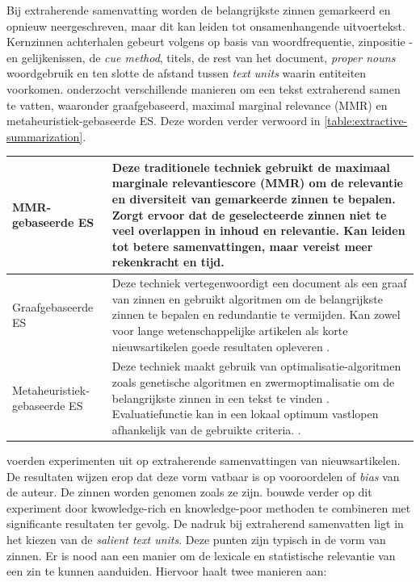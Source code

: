 \medspace

Bij extraherende samenvatting worden de belangrijkste zinnen gemarkeerd en opnieuw neergeschreven, maar dit kan leiden tot onsamenhangende uitvoertekst. Kernzinnen achterhalen gebeurt volgens \textcite{Khan2014} op basis van woordfrequentie, zinpositie -en gelijkenissen, de \textit{cue method}, titels, de rest van het document, \textit{proper nouns} woordgebruik en ten slotte de afstand tussen \textit{text units} waarin entiteiten voorkomen. \textcite{Verma2020} onderzocht verschillende manieren om een tekst extraherend samen te vatten, waaronder graafgebaseerd, maximal marginal relevance (MMR) en metaheuristiek-gebaseerde ES. Deze worden verder verwoord in \ref{table:extractive-summarization}.

\begin{center}
	\begin{tabular}{ | m{4cm} | m{12cm} | } 
		\hline
		MMR-gebaseerde ES & Deze traditionele techniek gebruikt de maximaal marginale relevantiescore (MMR) om de relevantie en diversiteit van gemarkeerde zinnen te bepalen. Zorgt ervoor dat de geselecteerde zinnen niet te veel overlappen in inhoud en relevantie. Kan leiden tot betere samenvattingen, maar vereist meer rekenkracht en tijd. \\
		\hline
		Graafgebaseerde ES & Deze techniek vertegenwoordigt een document als een graaf van zinnen en gebruikt algoritmen om de belangrijkste zinnen te bepalen en redundantie te vermijden. Kan zowel voor lange wetenschappelijke artikelen als korte nieuwsartikelen goede resultaten opleveren \autocite{McDonald2007, Lin2010}. \\ 
		\hline
		Metaheuristiek-gebaseerde ES & Deze techniek maakt gebruik van optimalisatie-algoritmen zoals genetische algoritmen en zwermoptimalisatie om de belangrijkste zinnen in een tekst te vinden \autocite{Premjith2015, Verma2020}. Evaluatiefunctie kan in een lokaal optimum vastlopen afhankelijk van de gebruikte criteria. \autocite{Rani2021}. \\
		\hline
	\end{tabular}
	\label{table:extractive-summarization}
\end{center}

\medspace


\textcite{McKeown1999} voerden experimenten uit op extraherende samenvattingen van nieuwsartikelen. De resultaten wijzen erop dat deze vorm vatbaar is op vooroordelen of \textit{bias} van de auteur. De zinnen worden genomen zoals ze zijn. \textcite{Hahn2000} bouwde verder op dit experiment door kwowledge-rich en knowledge-poor methoden te combineren met significante resultaten ter gevolg. De nadruk bij extraherend samenvatten ligt in het kiezen van de \textit{salient text units}. Deze punten zijn typisch in de vorm van zinnen. Er is nood aan een manier om de lexicale en statistische relevantie van een zin te kunnen aanduiden. Hiervoor haalt \textcite{Hahn2000} twee manieren aan:

